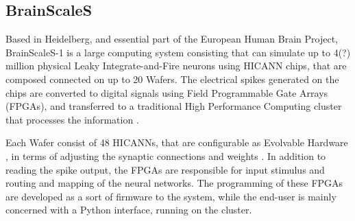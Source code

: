 \subsection{BrainScaleS}
Based in Heidelberg, and essential part of the European Human Brain Project,
BrainScaleS-1 is a large computing system consisting that can simulate
up to 4(?) million physical Leaky Integrate-and-Fire neurons using
HICANN chips, that are composed connected on up to 20 Wafers.
The electrical spikes generated on the chips are converted to digital
signals using Field Programmable Gate Arrays (FPGAs), and transferred to a traditional High Performance
Computing cluster that processes the information \cite{schemmel_wafer-scale_2010}.

Each Wafer consist of 48 HICANNs, that are configurable as Evolvable
Hardware \cite{trefzer_evolvable_2015}, in terms of adjusting the synaptic
connections and weights \cite{schemmel_wafer-scale_2010}. In addition to reading
the spike output, the FPGAs are responsible for input stimulus and
routing and mapping of the neural networks. The programming of these
FPGAs are developed as a sort of firmware to the system, while the
end-user is mainly concerned with a Python interface, running on the
cluster.


















